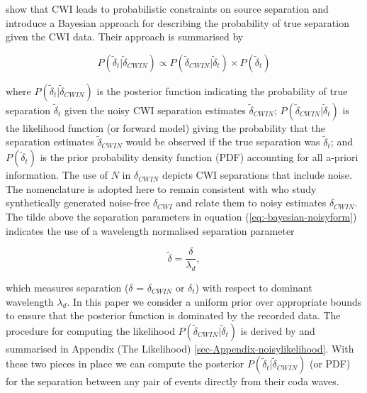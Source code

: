 \documentclass[12pt,double]{article}
\begin{document}
\citet{dr_Robinson11a} show that CWI leads to
probabilistic constraints on source separation and introduce a
Bayesian approach for describing the probability of true separation
given the CWI data. Their approach is summarised by
\begin{linenomath*} \begin{equation}
\label{eq:-bayesian-noisyform}
P(\widetilde{\delta}_t|\widetilde{\delta}_{CWIN}) \propto P(\widetilde{\delta}_{CWIN}|\widetilde{\delta}_t)
\times P(\widetilde{\delta}_t)
\end{equation} \end{linenomath*}
where  $P(\widetilde{\delta}_t|\widetilde{\delta}_{CWIN})$ is the
posterior function indicating the probability of true separation
$\widetilde{\delta}_t$ given the noisy CWI separation estimates
$\widetilde{\delta}_{CWIN}$;
$P(\widetilde{\delta}_{CWIN}|\widetilde{\delta}_t)$ is the
likelihood function (or forward model) giving the probability that
the separation estimates $\widetilde{\delta}_{CWIN}$ would be
observed if the true separation was $\widetilde{\delta}_t$; and
$P(\widetilde{\delta}_t)$ is the prior probability density function (PDF) accounting for all
a-priori information. The use of $N$ in $\delta_{CWIN}$ depicts CWI separations that include noise. 
The nomenclature is adopted here to remain consistent with \citet{dr_Robinson11a} who study 
synthetically generated noise-free $\delta_{CWI}$ and relate them to noisy estimates $\delta_{CWIN}$.
The tilde above the separation parameters in
equation (\ref{eq:-bayesian-noisyform}) indicates the use of a
wavelength normalised separation parameter
\begin{linenomath*} \begin{equation} 
\label{eq-normalisation-eqn}
\widetilde{\delta} = \frac{\delta}{\lambda_{d}},
\end{equation} \end{linenomath*}
which measures separation ($\delta$ = $\delta_{CWIN}$ or $\delta_t$)
with respect to dominant wavelength $\lambda_{d}$. In this paper we
consider a uniform prior over appropriate bounds to ensure that the
posterior function is dominated by the recorded data.
The procedure for computing the likelihood
$P(\widetilde{\delta}_{CWIN}|\widetilde{\delta}_t)$ is derived by
\citet{dr_Robinson11a} and summarised in Appendix (The Likelihood)
\ref{sec-Appendix-noisylikelihood}. With these two pieces in place
we can compute the posterior
$P(\widetilde{\delta}_t|\widetilde{\delta}_{CWIN})$ (or PDF) for the
separation between any pair of events directly from their coda
waves.
\end{document}
